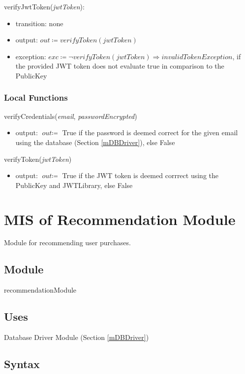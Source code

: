 \documentclass[12pt, titlepage]{article}
\begin{document}
\noindent verifyJwtToken(\textit{jwtToken}):
\begin{itemize}
\item transition: none
\item output: \( \textit{out} \coloneqq verifyToken(\textit{jwtToken})\)
\item exception: \( \textit{exc} \coloneqq \neg verifyToken(\textit{jwtToken}) \Rightarrow invalidTokenException \), if the provided JWT token does not evaluate true in comparison to the PublicKey
\end{itemize}

\subsubsection{Local Functions}
verifyCredentials(\textit{email}, \textit{passwordEncrypted})
\begin{itemize}
\item output: \( \textit{out} \coloneqq \) True if the password is deemed correct for the given email using the database (Section \ref{mDBDriver}), else False
\end{itemize}

\noindent verifyToken(\textit{jwtToken})
\begin{itemize}
\item output: \( \textit{out} \coloneqq \) True if the JWT token is deemed corrrect using the PublicKey and JWTLibrary, else False
\end{itemize}

\newpage

\section{MIS of Recommendation Module} \label{mRecommendation}

Module for recommending user purchases.

\subsection{Module}

recommendationModule

\subsection{Uses}

Database Driver Module (Section \ref{mDBDriver})

\subsection{Syntax}
\end{document}
